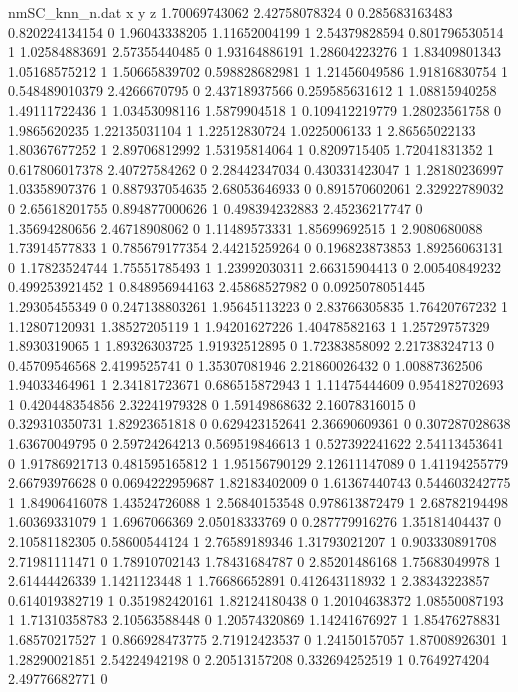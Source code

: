 \begin{filecontents}{nmSC_knn_n.dat}
x y z
1.70069743062 2.42758078324 0
0.285683163483 0.820224134154 0
1.96043338205 1.11652004199 1
2.54379828594 0.801796530514 1
1.02584883691 2.57355440485 0
1.93164886191 1.28604223276 1
1.83409801343 1.05168575212 1
1.50665839702 0.598828682981 1
1.21456049586 1.91816830754 1
0.548489010379 2.4266670795 0
2.43718937566 0.259585631612 1
1.08815940258 1.49111722436 1
1.03453098116 1.5879904518 1
0.109412219779 1.28023561758 0
1.9865620235 1.22135031104 1
1.22512830724 1.0225006133 1
2.86565022133 1.80367677252 1
2.89706812992 1.53195814064 1
0.8209715405 1.72041831352 1
0.617806017378 2.40727584262 0
2.28442347034 0.430331423047 1
1.28180236997 1.03358907376 1
0.887937054635 2.68053646933 0
0.891570602061 2.32922789032 0
2.65618201755 0.894877000626 1
0.498394232883 2.45236217747 0
1.35694280656 2.46718908062 0
1.11489573331 1.85699692515 1
2.9080680088 1.73914577833 1
0.785679177354 2.44215259264 0
0.196823873853 1.89256063131 0
1.17823524744 1.75551785493 1
1.23992030311 2.66315904413 0
2.00540849232 0.499253921452 1
0.848956944163 2.45868527982 0
0.0925078051445 1.29305455349 0
0.247138803261 1.95645113223 0
2.83766305835 1.76420767232 1
1.12807120931 1.38527205119 1
1.94201627226 1.40478582163 1
1.25729757329 1.8930319065 1
1.89326303725 1.91932512895 0
1.72383858092 2.21738324713 0
0.45709546568 2.4199525741 0
1.35307081946 2.21860026432 0
1.00887362506 1.94033464961 1
2.34181723671 0.686515872943 1
1.11475444609 0.954182702693 1
0.420448354856 2.32241979328 0
1.59149868632 2.16078316015 0
0.329310350731 1.82923651818 0
0.629423152641 2.36690609361 0
0.307287028638 1.63670049795 0
2.59724264213 0.569519846613 1
0.527392241622 2.54113453641 0
1.91786921713 0.481595165812 1
1.95156790129 2.12611147089 0
1.41194255779 2.66793976628 0
0.0694222959687 1.82183402009 0
1.61367440743 0.544603242775 1
1.84906416078 1.43524726088 1
2.56840153548 0.978613872479 1
2.68782194498 1.60369331079 1
1.6967066369 2.05018333769 0
0.287779916276 1.35181404437 0
2.10581182305 0.58600544124 1
2.76589189346 1.31793021207 1
0.903330891708 2.71981111471 0
1.78910702143 1.78431684787 0
2.85201486168 1.75683049978 1
2.61444426339 1.1421123448 1
1.76686652891 0.412643118932 1
2.38343223857 0.614019382719 1
0.351982420161 1.82124180438 0
1.20104638372 1.08550087193 1
1.71310358783 2.10563588448 0
1.20574320869 1.14241676927 1
1.85476278831 1.68570217527 1
0.866928473775 2.71912423537 0
1.24150157057 1.87008926301 1
1.28290021851 2.54224942198 0
2.20513157208 0.332694252519 1
0.7649274204 2.49776682771 0

\end{filecontents}
